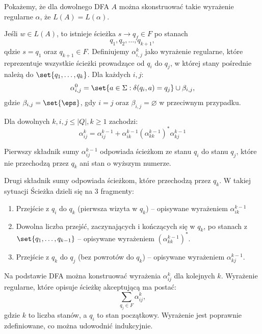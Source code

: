     Pokażemy, że dla dowolnego DFA \(A\) można skonstruować takie wyrażenie regularne \(\alpha\), że \( L(A) = L(\alpha)\). 
    
    Jeśli \( w \in L(A) \), to istnieje ścieżka \( s \rightarrow q_f \in F \) po stanach
    \[
        q_1, q_2, \dots, q_{k+1},
    \]
    qdzie \( s = q_1 \) oraz \( q_{k+1} \in F\).
    Definiujemy \( \alpha_{i, j}^k \) jako wyrażenie regularne, które reprezentuje wszystkie ścieżki prowadzące od \( q_i \) do \( q_j \), w której stany pośrednie należą do \( \set{q_1, \dots, q_k} \). Dla każdych \(i, j\):
    \[
        \alpha_{i, j}^0 = \set{a \in \Sigma : \delta(q_i, a) = q_j } \cup \beta_{i, j},
    \]
    gdzie \( \beta_{i, j} = \set{\eps} \), gdy \( i = j \) oraz \( \beta_{i, j} = \varnothing \) w przeciwnym przypadku.
    
    Dla dowolnych \(k, i, j \leq |Q|, k \geq 1 \) zachodzi:
    \[ 
        \alpha^{k}_{ij} = \alpha^{k-1}_{ij} + \alpha^{k-1}_{ik} (\alpha^{k-1}_{kk})^* \alpha^{k-1}_{kj} 
    \]
    
    Pierwszy składnik sumy \( \alpha^{k-1}_{ij} \) odpowiada ścieżkom ze stanu \(q_i\) do stanu \(q_j\), które nie przechodzą przez \(q_k\) ani stan o wyższym numerze.

    Drugi składnik sumy odpowiada ścieżkom, które przechodzą przez \(q_k\). W takiej sytuacji Ścieżka dzieli się na 3 fragmenty:
    \begin{enumerate}
        \item Przejście z \(q_i\) do \(q_k\) (pierwsza wizyta w  \(q_k\)) -- opisywane wyrażeniem \(\alpha^{k-1}_{ik}\)
        \item Dowolna liczba przejść, zaczynających i kończących się w \(q_k\), po stanach z \( \set{q_1, \dots, q_{k-1}} \) -- opisywane wyrażeniem \( (\alpha^{k-1}_{kk})^* \).
        \item Przejście z \(q_k\) do \(q_j\) (bez powrotów do \(q_k\)) -- opisywane wyrażeniem \( \alpha^{k-1}_{kj} \). 
    \end{enumerate}
    
    Na podstawie DFA można konstruować wyrażenia \( \alpha^{k}_{ij} \) dla kolejnych \(k\).
    Wyrażenie regularne, które opisuje ścieżkę akceptującą ma postać:
    \[
        \sum_{q_j \in F} \alpha^{k}_{ij},
    \]
    gdzie \(k\) to liczba stanów, a \(q_i\) to stan początkowy. Wyrażenie jest poprawnie zdefiniowane, co można udowodnić indukcyjnie.
